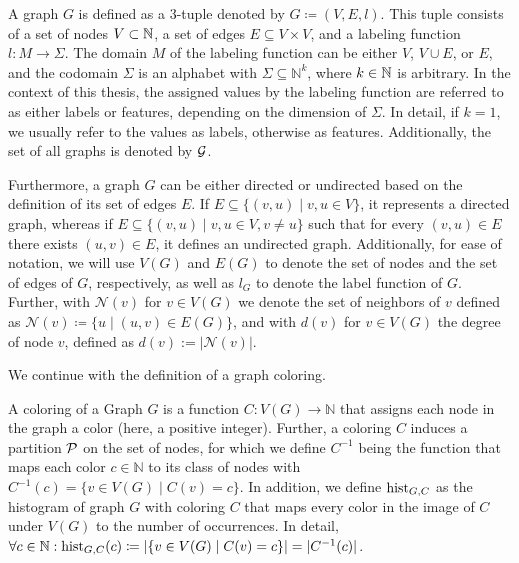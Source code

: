 \begin{definition}[Graph]
A graph $G$ is defined as a 3-tuple denoted by $G \coloneqq (V, E, l)$. This tuple consists of a set of nodes $V \subset \mathbb{N}$, a set of edges $E \subseteq V \times V$, and a labeling function $l: M \rightarrow \Sigma$. The domain $M$ of the labeling function can be either $V$, $V \cup E$, or $E$, and the codomain $\Sigma$ is an alphabet with $\Sigma \subseteq \mathbb{N}^k$, where $k \in \mathbb{N}$ is arbitrary.
In the context of this thesis, the assigned values by the labeling function are referred to as either labels or features, depending on the dimension of $\Sigma$. In detail, if $k=1$, we usually refer to the values as labels, otherwise as features. Additionally, the set of all graphs is denoted by $\mathcal{G}$.

Furthermore, a graph $G$ can be either directed or undirected based on the definition of its set of edges $E$. If $E \subseteq \{(v,u) \mid v,u \in V\}$, it represents a directed graph, whereas if $E \subseteq \{(v, u) \mid v,u \in V, v\neq u\}$ such that for every $(v,u) \in E$ there exists $(u,v) \in E$, it defines an undirected graph. Additionally, for ease of notation, we will use $V(G)$ and $E(G)$ to denote the set of nodes and the set of edges of $G$, respectively, as well as $l_G$ to denote the label function of $G$. Further, with $\mathcal{N}(v)$ for $v \in V(G)$ we denote the set of neighbors of $v$ defined as $\mathcal{N}(v) \coloneqq \{u \mid (u, v) \in E(G)\}$, and with $d(v)$ for $v \in V(G)$ the degree of node $v$, defined as $d(v) := |\mathcal{N}(v)|$.
\end{definition}

We continue with the definition of a graph coloring.

\begin{definition}
A coloring of a Graph $G$ is a function $C: V(G) \rightarrow \mathbb{N}$ that assigns each node in the graph a color (here, a positive integer). Further, a coloring $C$ induces a partition $\mathcal{P}$ on the set of nodes, for which we define $C^{-1}$ being the function that maps each color $c \in \mathbb{N}$ to its class of nodes with $C^{-1}(c) = \{ v\in V(G) \mid C(v) = c\}$. In addition, we define $\operatorname{hist}_{G, C}$ as the histogram of graph $G$ with coloring $C$ that maps every color in the image of $C$ under $V(G)$ to the number of occurrences. In detail, $\forall c \in \mathbb{N}: \operatorname{hist}_{G, C}(c) \coloneqq | \{ v \in V(G) \mid C(v) = c \} | = | C^{-1}(c) |$.
\end{definition}

